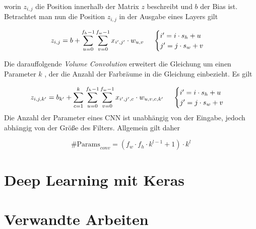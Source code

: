 worin $z_{i,j}$ die Position innerhalb der Matrix $z$ beschreibt und $b$ der \gls{Bias} ist. Betrachtet man nun die Position $z_{i,j}$ in der Ausgabe eines Layers gilt 

\begin{equation}
	z_{i,j}=b+\sum_{u=0}^{f_{h}-1}\sum_{v=0}^{f_{w}-1}{x_{i',j'}\cdot w_{u,v}}\text{  \space\space\space    } \begin{cases}
	i' = i \cdot s_{h} + u \\ j' = j \cdot s_{w} + v 
\end{cases}
\end{equation}

Die darauffolgende \emph{Volume Convolution} erweitert die Gleichung um einen Parameter $k$ , der die Anzahl der Farbräume in die Gleichung einbezieht. Es gilt
	
\begin{equation}
	z_{i,j,k'}=b_{k'}+\sum_{c=1}^k{}\sum_{u=0}^{f_{h}-1}\sum_{v=0}^{f_{w}-1}{x_{i',j',c}\cdot w_{u,v,c,k'}}\text{  \space\space\space    } \begin{cases}
	i' = i \cdot s_{h} + u \\ j' = j \cdot s_{w} + v 
\end{cases}
\end{equation}
Die Anzahl der Parameter eines \ac{CNN} ist unabhängig von der Eingabe, jedoch abhängig von der Größe des Filters. Allgemein gilt daher 

\begin{equation}
	\text{\#{ }Params}_{conv} = (f_{w} \cdot f_{h} \cdot k^{l-1} + 1) \cdot k^l
\end{equation}








\section{Deep Learning mit Keras}

\section{Verwandte Arbeiten}
